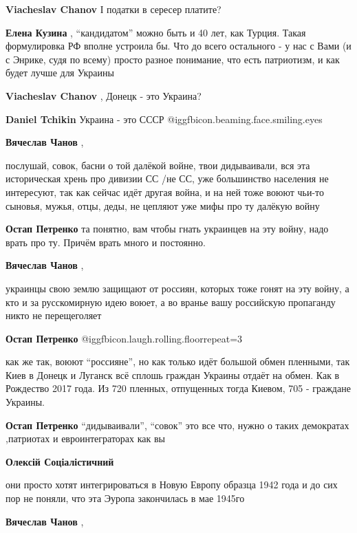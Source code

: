 \begin{itemize}
\begin{itemize}
\textbf{Viacheslav Chanov} І податки в сересер платите?

\textbf{Елена Кузина} , \enquote{кандидатом} можно быть и 40 лет, как Турция. Такая формулировка РФ вполне устроила бы.
Что до всего остального - у нас с Вами (и с Энрике, судя по всему) просто разное понимание, что есть патриотизм, и как будет лучше для Украины

\textbf{Viacheslav Chanov} , Донецк - это Украина?

\textbf{Daniel Tchikin} Украина - это СССР @igg{fbicon.beaming.face.smiling.eyes} 

\textbf{Вячеслав Чанов} , 

послушай, совок, басни о той далёкой войне, твои дидываивали, вся эта
историческая хрень про дивизии СС /не СС, уже большинство населения не
интересуют, так как сейчас идёт другая война, и на ней тоже воюют чьи-то
сыновья, мужья, отцы, деды, не цепляют уже мифы про ту далёкую войну


\textbf{Остап Петренко} та понятно, вам чтобы гнать украинцев на эту войну, надо врать про ту. Причём врать много и постоянно.

\textbf{Вячеслав Чанов} , 

украинцы свою землю защищают от россиян, которых тоже гонят на эту войну, а кто
и за русскомирную идею воюет, а во вранье вашу российскую пропаганду никто не
перещеголяет

\textbf{Остап Петренко}  @igg{fbicon.laugh.rolling.floor}{repeat=3}  

как же так, воюют \enquote{россияне}, но как только идёт большой обмен пленными, так
Киев в Донецк и Луганск всё сплошь граждан Украины отдаёт на обмен. Как в
Рождество 2017 года. Из 720 пленных, отпущенных тогда Киевом, 705 - граждане
Украины.

\textbf{Остап Петренко} \enquote{дидываивали}, \enquote{совок} это все что, нужно о таких демократах ,патриотах и евроинтеграторах как вы

\textbf{Олексій Соціалістичний} 

они просто хотят интегрироваться в Новую Европу образца 1942 года и до сих пор
не поняли, что эта Эуропа закончилась в мае 1945го

\textbf{Вячеслав Чанов} , 


\end{itemize}
\end{itemize}
